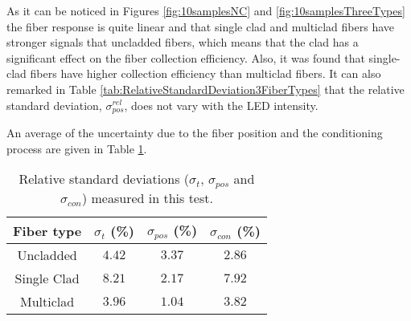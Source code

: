 As it can be noticed in Figures \ref{fig:10samplesNC} and \ref{fig:10samplesThreeTypes} the fiber response is quite linear and that single clad and multiclad fibers have stronger signals that uncladded fibers, which means that the clad has a significant effect on the fiber collection efficiency. Also, it was found that single-clad fibers have higher collection efficiency than multiclad fibers. It can also remarked in Table \ref{tab:RelativeStandardDeviation3FiberTypes} that the relative standard deviation, $\sigma^{rel}_{pos}$, does not vary with the LED intensity.



An average of the uncertainty due to the fiber position and the conditioning process are given in Table \ref{tab:RelativeStandardDeviations}.

\begin{table}[htbp]
\begin{center}
\begin{tabular}{|c|c|c|c|}
\hline
Fiber type & $\sigma_t$ (\%) & $\sigma_{pos}$ (\%) & $\sigma_{con}$ (\%)\\\hline \hline \hline
Uncladded & $4.42$ & $3.37$ & $2.86$ \\ \hline
Single Clad & $8.21$ & $2.17$ & $7.92$ \\ \hline
Multiclad & $3.96$ & $1.04$ & $3.82$ \\ \hline
\end{tabular}
\caption{Relative standard deviations ($\sigma_t$, $\sigma_{pos}$ and $\sigma_{con}$) measured in this test.}
\label{tab:RelativeStandardDeviations}
\end{center}
\end{table}

